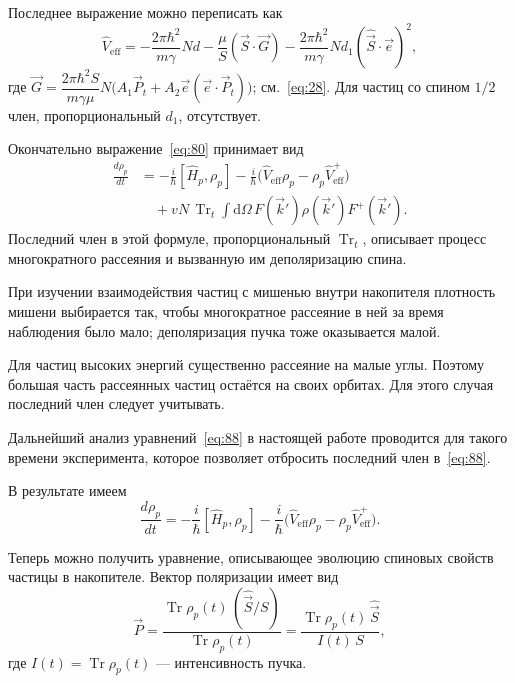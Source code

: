 \documentclass[11pt,a4paper]{article}
\DeclareMathOperator{\Tr}{Tr}
\newcommand{\hvec}[1]{\hat{\vec{#1}}}
\begin{document}
Последнее выражение можно переписать как
\begin{equation}
\hat{V}_{\mathrm{eff}}
=-\frac{2\pi\hbar^2}{m\gamma}N d
-\frac{\mu}{S}(\vec{S}\cdot\vec{G})
-\frac{2\pi\hbar^2}{m\gamma}N d_1(\hvec{S}\cdot\vec{e})^2,
\label{eq:87}
\end{equation}
где $\vec{G}=\dfrac{2\pi\hbar^2 S}{m\gamma\mu}N\bigl(A_1\vec{P}_t+A_2\vec{e}(\vec{e}\cdot\vec{P}_t)\bigr)$;
см.~\eqref{eq:28}. Для частиц со спином $1/2$ член, пропорциональный $d_1$,
отсутствует.

Окончательно выражение~\eqref{eq:80} принимает вид
\begin{equation}
\begin{aligned}
\frac{d\rho_p}{dt}
&=-\frac{i}{\hbar}[\hat{H}_p,\rho_p]
-\frac{i}{\hbar}\bigl(\hat{V}_{\mathrm{eff}}\rho_p-\rho_p\hat{V}_{\mathrm{eff}}^+\bigr)
\\
&\quad
+v N\,\Tr_t\int\mathrm{d}\Omega\, F(\vec{k}')\rho(\vec{k}')F^+(\vec{k}').
\end{aligned}
\label{eq:88}
\end{equation}
Последний член в этой формуле, пропорциональный $\Tr_t$, описывает
процесс многократного рассеяния и вызванную им деполяризацию спина.

При изучении взаимодействия частиц с мишенью внутри накопителя плотность
мишени выбирается так, чтобы многократное рассеяние в ней за время
наблюдения было мало; деполяризация пучка тоже оказывается малой.

Для частиц высоких энергий существенно рассеяние на малые углы. Поэтому
большая часть рассеянных частиц остаётся на своих орбитах. Для этого
случая последний член следует учитывать.

Дальнейший анализ уравнений~\eqref{eq:88} в настоящей работе проводится
для такого времени эксперимента, которое позволяет отбросить последний
член в~\eqref{eq:88}.

В результате имеем
\begin{equation}
\frac{d\rho_p}{dt}
=-\frac{i}{\hbar}[\hat{H}_p,\rho_p]
-\frac{i}{\hbar}\bigl(\hat{V}_{\mathrm{eff}}\rho_p-\rho_p\hat{V}_{\mathrm{eff}}^+\bigr).
\label{eq:89}
\end{equation}

Теперь можно получить уравнение, описывающее эволюцию спиновых свойств
частицы в накопителе. Вектор поляризации имеет вид
\begin{equation}
\vec{P}
=\frac{\Tr\rho_p(t)\,(\hvec{S}/S)}{\Tr\rho_p(t)}
=\frac{\Tr\rho_p(t)\,\hvec{S}}{I(t)\,S},
\label{eq:90}
\end{equation}
где $I(t)=\Tr\rho_p(t)$ --- интенсивность пучка.
\end{document}
